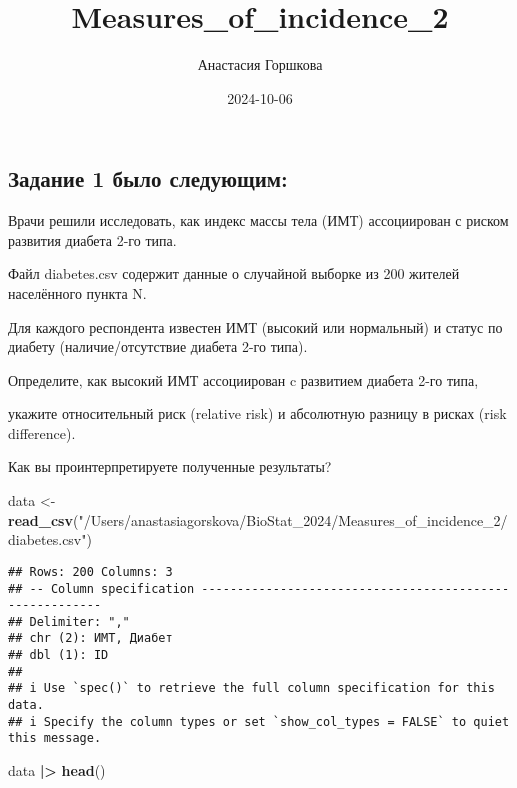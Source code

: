 \documentclass[
]{article}
\title{Measures\_of\_incidence\_2}
\author{Анастасия Горшкова}
\date{2024-10-06}
\newenvironment{Shaded}{\begin{snugshade}}{\end{snugshade}}
\newcommand{\FunctionTok}[1]{\textcolor[rgb]{0.13,0.29,0.53}{\textbf{#1}}}
\newcommand{\NormalTok}[1]{#1}
\newcommand{\OtherTok}[1]{\textcolor[rgb]{0.56,0.35,0.01}{#1}}
\newcommand{\SpecialCharTok}[1]{\textcolor[rgb]{0.81,0.36,0.00}{\textbf{#1}}}
\newcommand{\StringTok}[1]{\textcolor[rgb]{0.31,0.60,0.02}{#1}}
\begin{document}
\maketitle

\subsection{Задание 1 было
следующим:}\label{ux437ux430ux434ux430ux43dux438ux435-1-ux431ux44bux43bux43e-ux441ux43bux435ux434ux443ux44eux449ux438ux43c}

Врачи решили исследовать, как индекс массы тела (ИМТ) ассоциирован с
риском развития диабета 2-го типа.

Файл diabetes.csv содержит данные о случайной выборке из 200 жителей
населённого пункта N.

Для каждого респондента известен ИМТ (высокий или нормальный) и статус
по диабету (наличие/отсутствие диабета 2-го типа).

Определите, как высокий ИМТ ассоциирован c развитием диабета 2-го типа,

укажите относительный риск (relative risk) и абсолютную разницу в рисках
(risk difference).

Как вы проинтерпретируете полученные результаты?

\begin{Shaded}
\begin{Highlighting}[]
\NormalTok{data }\OtherTok{\textless{}{-}} \FunctionTok{read\_csv}\NormalTok{(}\StringTok{"/Users/anastasiagorskova/BioStat\_2024/Measures\_of\_incidence\_2/diabetes.csv"}\NormalTok{)}
\end{Highlighting}
\end{Shaded}

\begin{verbatim}
## Rows: 200 Columns: 3
## -- Column specification --------------------------------------------------------
## Delimiter: ","
## chr (2): ИМТ, Диабет
## dbl (1): ID
## 
## i Use `spec()` to retrieve the full column specification for this data.
## i Specify the column types or set `show_col_types = FALSE` to quiet this message.
\end{verbatim}

\begin{Shaded}
\begin{Highlighting}[]
\NormalTok{data }\SpecialCharTok{|\textgreater{}} \FunctionTok{head}\NormalTok{()}
\end{Highlighting}
\end{Shaded}
\end{document}
